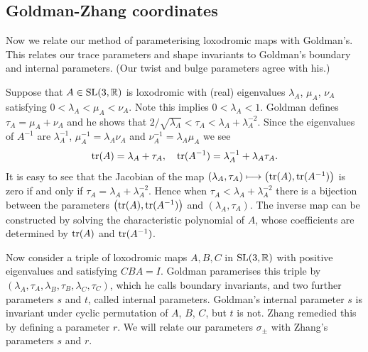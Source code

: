 \documentclass[11pt]{amsart}
\numberwithin{equation}{section}
\begin{document}
\subsection{Goldman-Zhang coordinates}

Now we relate our method of parameterising loxodromic maps with Goldman's. This relates our trace parameters and
shape invariants to Goldman's boundary and internal parameters. (Our twist and bulge parameters agree with his.)

Suppose that $A\in{\rm SL}(3,{\mathbb R})$ is loxodromic with (real) eigenvalues $\lambda_A$, $\mu_A$, $\nu_A$ satisfying
$0<\lambda_A<\mu_A<\nu_A$. Note this implies $0<\lambda_A<1$. Goldman defines $\tau_A=\mu_A+\nu_A$ and he shows that 
$2/\sqrt{\lambda_A}<\tau_A<\lambda_A+\lambda_A^{-2}$. Since the eigenvalues of $A^{-1}$ are $\lambda_A^{-1}$, 
$\mu_A^{-1}=\lambda_A\nu_A$ and $\nu_A^{-1}=\lambda_A\mu_A$ we see
$$
{\rm tr}(A)=\lambda_A+\tau_A,\quad {\rm tr}(A^{-1})=\lambda_A^{-1}+\lambda_A\tau_A.
$$
It is easy to see that the Jacobian of the map $(\lambda_A,\tau_A)\longmapsto\bigl({\rm tr}(A),{\rm tr}(A^{-1})\bigr)$
is zero if and only if $\tau_A=\lambda_A+\lambda_A^{-2}$. Hence when $\tau_A<\lambda_A+\lambda_A^{-2}$ there is a 
bijection between the parameters $\bigl({\rm tr}(A),{\rm tr}(A^{-1})\bigr)$ and $(\lambda_A,\tau_A)$. The inverse map
can be constructed by solving the characteristic polynomial of $A$, whose coefficients are determined by
${\rm tr}(A)$ and ${\rm tr}(A^{-1})$.

Now consider a triple of loxodromic maps $A,B,C$ in ${\rm SL}(3,{\mathbb R})$ with positive eigenvalues and satisfying
$CBA=I$. Goldman paramerises this triple by $(\lambda_A,\tau_A,\lambda_B,\tau_B,\lambda_C,\tau_C)$, which he calls
boundary invariants, and two further parameters $s$ and $t$, called internal parameters. 
Goldman's internal parameter $s$ is invariant under cyclic permutation
of $A$, $B$, $C$, but $t$ is not. Zhang \cite{Zhang2} remedied this by defining a parameter $r$. We will relate our 
parameters $\sigma_\pm$ with Zhang's parameters $s$ and $r$. 
\end{document}
